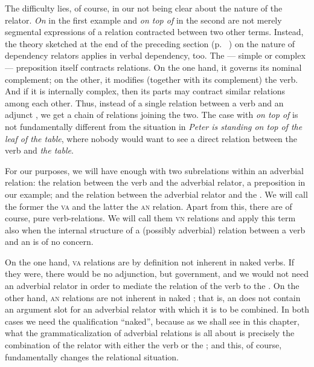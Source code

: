 The difficulty lies, of course, in our not being clear about the nature of the relator. \textit{On} in the first example and \textit{on top of} in the second are not merely segmental expressions of a relation contracted between two other terms. Instead, the theory sketched at the end of the preceding section (p.~\pageref{page78}\chk%
) on the nature of dependency relators applies in verbal dependency, too. The — simple or complex — preposition itself contracts relations. On the one hand, it governs its nominal complement; on the other, it modifies (together with its complement) the verb. And if it is internally complex, then its parts may contract similar relations among each other. Thus, instead of a single relation between a verb and an adjunct \np, we get a chain of relations joining the two. The case with \textit{on top of} is not fundamentally different from the situation in \textit{Peter is standing on top of the leaf of the table}, where nobody would want to see a direct relation between the verb and \textit{the table}.

For our purposes, we will have enough with two subrelations within an adverbial relation: the relation between the verb and the adverbial relator, a preposition in our example; and the relation between the adverbial relator and the \np. We will call the former the \textsc{va} and the latter the \textsc{an} relation. Apart from this, there are of course, pure verb-\np relations. We will call them \textsc{vn} relations and apply this term also when the internal structure of a (possibly adverbial) relation between a verb and an \np is of no concern.

On the one hand, \textsc{va} relations are by definition not inherent in naked verbs. If they were, there would be no adjunction, but government, and we would not need an adverbial relator in order to mediate the relation of the verb to the \np. On the other hand, \textsc{an} relations are not inherent in naked \nps; that is, an \np does not contain an argument slot for an adverbial relator with which it is to be combined. In both cases we need the qualification ``naked'', because as we shall see in this chapter, what the grammaticalization of adverbial relations is all about is precisely the combination of the relator with either the verb or the \np; and this, of course, fundamentally changes the relational situation.

